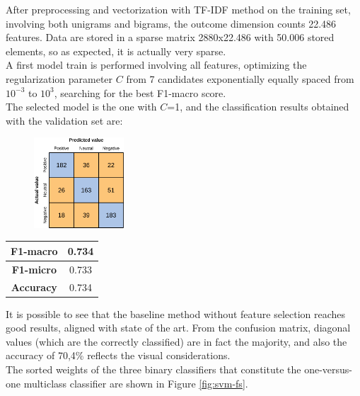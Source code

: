 After preprocessing and vectorization with TF-IDF method on the training set, involving both unigrams and bigrams, the outcome dimension counts 22.486 features. Data are stored in a sparse matrix 2880x22.486 with 50.006 stored elements, so as expected, it is actually very sparse.\\
A first model train is performed involving all features, optimizing the regularization parameter $C$ from 7 candidates exponentially equally spaced from $10^{-3}$ to $10^3$, searching for the best F1-macro score.\\
The selected model is the one with $C$=1, and the classification results obtained with the validation set are:

\begin{figure}[ht]
	\centering
	\includegraphics[width=0.3\textwidth]{figures/conf_matrices/twitter_sent_svm/tw_snt_svm_bfs.pdf}
	\label{fig:conf}
\end{figure}

\begin{center}
	\begin{tabular}{ | c | c | } 
		\hline
		\textbf{F1-macro} & 0.734 \\
		\hline
		\textbf{F1-micro} & 0.733 \\ 
		\hline
		\textbf{Accuracy} & 0.734 \\ 
		\hline
	\end{tabular}
\end{center}

It is possible to see that the baseline method without feature selection reaches good results, aligned with state of the art. From the confusion matrix, diagonal values (which are the correctly classified) are in fact the majority, and also the accuracy of 70,4\% reflects the visual considerations.\\
The sorted weights of the three binary classifiers that constitute the one-versus-one multiclass classifier are shown in Figure \ref{fig:svm-fs}.


